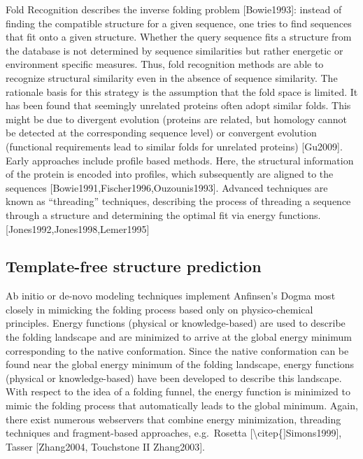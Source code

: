 \documentclass[12pt,a4paper,twoside]{book}
\theoremstyle{definition}
\theoremstyle{definition}
\theoremstyle{remark}
\begin{document}
Fold Recognition describes the inverse folding problem {[}Bowie1993{]}:
instead of finding the compatible structure for a given sequence, one
tries to find sequences that fit onto a given structure. Whether the
query sequence fits a structure from the database is not determined by
sequence similarities but rather energetic or environment specific
measures. Thus, fold recognition methods are able to recognize
structural similarity even in the absence of sequence similarity. The
rationale basis for this strategy is the assumption that the fold space
is limited. It has been found that seemingly unrelated proteins often
adopt similar folds. This might be due to divergent evolution (proteins
are related, but homology cannot be detected at the corresponding
sequence level) or convergent evolution (functional requirements lead to
similar folds for unrelated proteins) {[}Gu2009{]}. Early approaches
include profile based methods. Here, the structural information of the
protein is encoded into profiles, which subsequently are aligned to the
sequences {[}Bowie1991,Fischer1996,Ouzounis1993{]}. Advanced techniques
are known as ``threading'' techniques, describing the process of
threading a sequence through a structure and determining the optimal fit
via energy functions. {[}Jones1992,Jones1998,Lemer1995{]}

\subsection{Template-free structure
prediction}\label{template-free-structure-prediction}

Ab initio or de-novo modeling techniques implement Anfinsen's Dogma most
closely in mimicking the folding process based only on physico-chemical
principles. Energy functions (physical or knowledge-based) are used to
describe the folding landscape and are minimized to arrive at the global
energy minimum corresponding to the native conformation. Since the
native conformation can be found near the global energy minimum of the
folding landscape, energy functions (physical or knowledge-based) have
been developed to describe this landscape. With respect to the idea of a
folding funnel, the energy function is minimized to mimic the folding
process that automatically leads to the global minimum. Again, there
exist numerous webservers that combine energy minimization, threading
techniques and fragment-based approaches, e.g.~Rosetta
{[}\textbackslash{}citep\{{]}Simons1999{]}, Tasser {[}Zhang2004,
Touchstone II Zhang2003{]}.
\end{document}

